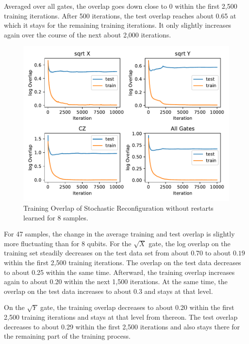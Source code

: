 Averaged over all gates, the overlap goes down close to 0 within the first 2,500 training iterations. 
After 500 iterations, the test 
overlap reaches about 0.65 at which it stays for the remaining training iterations. It only 
slightly increases again over the course of the next about 2,000 iterations.


\begin{figure}[H]
  \centering
  \includegraphics[width=\textwidth]{figures/results/SR-no-restarts-learned/avgOverlap_8.pdf}
  \caption[Training and Testing Overlaps for Stochastic Reconfiguration without Random Restarts and $CZ$ Gates Learned - 8 Samples]{Training 
  Overlap of Stochastic Reconfiguration without restarts learned for 8 samples.}
  \label{fig:sr_no_restarts_overlap_8}
\end{figure}

For 47 samples, the change in the average training and test overlap is slightly more fluctuating than for 8 qubits. For the 
$\sqrt{X}$ gate, the log overlap on the training set steadily decreases on the test data set from 
about $0.70$ to about $0.19$ within the first 2,500 training iterations. The overlap on the test data 
decreases to about 0.25 within the same time. Afterward, the training overlap increases again to about 
0.20 within the next 1,500 iterations. At the same time, the overlap on the test data increases to about 
0.3 and stays at that level.

On the $\sqrt{Y}$ gate, the training overlap decreases to about 0.20 within the first 2,500 training iterations 
and stays at that level from thereon. The test overlap decreases to about 0.29 within the first 2,500 iterations 
and also stays there for the remaining part of the training process.

